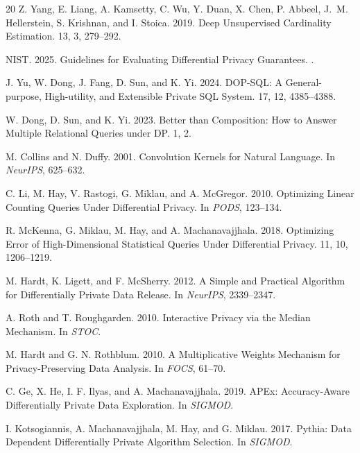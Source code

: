 \documentclass[sigconf,nonacm]{acmart}
\begin{document}
\begin{thebibliography}{20}
Z. Yang, E. Liang, A. Kamsetty, C. Wu, Y. Duan, X. Chen, P. Abbeel, J.~M. Hellerstein, S. Krishnan, and I. Stoica. 2019.
\newblock Deep Unsupervised Cardinality Estimation.
 13, 3, 279--292.

NIST. 2025.
\newblock Guidelines for Evaluating Differential Privacy Guarantees.
.

J. Yu, W. Dong, J. Fang, D. Sun, and K. Yi. 2024.
\newblock DOP-SQL: A General-purpose, High-utility, and Extensible Private SQL System.
 17, 12, 4385--4388.

W. Dong, D. Sun, and K. Yi. 2023.
\newblock Better than Composition: How to Answer Multiple Relational Queries under DP.
 1, 2.

M. Collins and N. Duffy. 2001.
\newblock Convolution Kernels for Natural Language.
\newblock In {\em NeurIPS}, 625--632.

C. Li, M. Hay, V. Rastogi, G. Miklau, and A. McGregor. 2010.
\newblock Optimizing Linear Counting Queries Under Differential Privacy.
\newblock In {\em PODS}, 123--134.

R. McKenna, G. Miklau, M. Hay, and A. Machanavajjhala. 2018.
\newblock Optimizing Error of High-Dimensional Statistical Queries Under Differential Privacy.
 11, 10, 1206--1219.

M. Hardt, K. Ligett, and F. McSherry. 2012.
\newblock A Simple and Practical Algorithm for Differentially Private Data Release.
\newblock In {\em NeurIPS}, 2339--2347.

A. Roth and T. Roughgarden. 2010.
\newblock Interactive Privacy via the Median Mechanism.
\newblock In {\em STOC}.

M. Hardt and G. N. Rothblum. 2010.
\newblock A Multiplicative Weights Mechanism for Privacy-Preserving Data Analysis.
\newblock In {\em FOCS}, 61--70.

C. Ge, X. He, I. F. Ilyas, and A. Machanavajjhala. 2019.
\newblock APEx: Accuracy-Aware Differentially Private Data Exploration.
\newblock In {\em SIGMOD}.

I. Kotsogiannis, A. Machanavajjhala, M. Hay, and G. Miklau. 2017.
\newblock Pythia: Data Dependent Differentially Private Algorithm Selection.
\newblock In {\em SIGMOD}.


\end{thebibliography}
\end{document}
